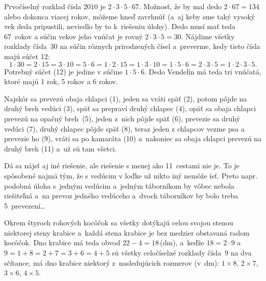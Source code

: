 {%
Prvočíselný rozklad čísla $2010$ je $2\cdot3\cdot5\cdot67$.
Možnosť, že by mal dedo ${2\cdot67=134}$ alebo dokonca viacej rokov, môžeme hneď
zavrhnúť (a~aj keby sme taký vysoký vek deda pripustili, neviedlo by to k~riešeniu úlohy).
Dedo musí mať teda 67~rokov a súčin vekov jeho vnúčat je rovný
$2\cdot3\cdot5=30$. Nájdime všetky rozklady čísla~30 na súčin rôznych
prirodzených čísel a~preverme, kedy tieto čísla majú súčet 12:
$$
1\cdot30 = 2\cdot15 = 3\cdot10 = 5\cdot6 = 1\cdot2\cdot15 = 1\cdot3\cdot10
  = 1\cdot5\cdot6 = 2\cdot3\cdot5 = 1\cdot2\cdot3\cdot5.
$$
Potrebný súčet (12) je jedine v súčine $1\cdot5\cdot6$. Dedo Vendelín má
teda tri vnúčatá, ktoré majú 1 rok, 5 rokov a 6 rokov.
}

{%
Najskôr sa prevezú obaja chlapci (1),
jeden sa vráti späť (2),
potom pôjde na druhý breh vedúci (3),
späť sa prepraví druhý chlapec (4),
opäť sa obaja chlapci prevezú na opačný breh~(5),
jeden z~nich pôjde späť (6),
prevezie sa druhý vedúci (7),
druhý chlapec pôjde späť (8),
teraz jeden z chlapcov vezme psa a prevezie ho (9),
vráti sa po kamaráta (10)
a~nakoniec sa obaja chlapci prevezú na druhý breh (11) a~už sú tam všetci.

\poznamka
Dá sa nájsť aj iné riešenie, ale riešenie s menej ako 11~cestami nie je.
To je spôsobené najmä tým, že s vedúcim v loďke už nikto iný nemôže ísť.
Preto napr. podobná úloha s~jedným vedúcim a~jedným táborníkom by vôbec nebola
riešiteľná a~na prevoz jedného vedúceho a~dvoch táborníkov by bolo
treba 5~prevezení\dots
}

{%
Okrem štyroch rohových kocôčok sa všetky dotýkajú celou svojou stenou niektorej steny krabice
a~každá stena krabice je bez medzier obstavaná radom kocôčok.
Dno krabice má teda obvod $22-4=18$\,(dm), a~keďže
$18=2\cdot9$ a~$9={1+8}=2+7=3+6=4+5$ sú všetky celočíselné rozklady
čísla~$9$ na dva sčítance, má dno krabice niektorý z~nasledujúcich rozmerov (v~dm):
$1\times8$, $2\times7$, $3\times6$,  $4\times5$.
}

